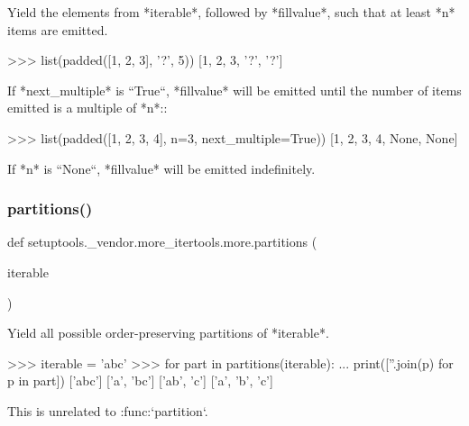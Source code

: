 \begin{DoxyVerb}Yield the elements from *iterable*, followed by *fillvalue*, such that
at least *n* items are emitted.

    >>> list(padded([1, 2, 3], '?', 5))
    [1, 2, 3, '?', '?']

If *next_multiple* is ``True``, *fillvalue* will be emitted until the
number of items emitted is a multiple of *n*::

    >>> list(padded([1, 2, 3, 4], n=3, next_multiple=True))
    [1, 2, 3, 4, None, None]

If *n* is ``None``, *fillvalue* will be emitted indefinitely.\end{DoxyVerb}
 \mbox{\label{namespacesetuptools_1_1__vendor_1_1more__itertools_1_1more_aff68c3cfb337e2d85ce1f65b4a7ac344}} 
\subsubsection{\texorpdfstring{partitions()}{partitions()}}
{\footnotesize\ttfamily def setuptools.\+\_\+vendor.\+more\+\_\+itertools.\+more.\+partitions (\begin{DoxyParamCaption}\item[{}]{iterable }\end{DoxyParamCaption})}

\begin{DoxyVerb}Yield all possible order-preserving partitions of *iterable*.

>>> iterable = 'abc'
>>> for part in partitions(iterable):
...     print([''.join(p) for p in part])
['abc']
['a', 'bc']
['ab', 'c']
['a', 'b', 'c']

This is unrelated to :func:`partition`.\end{DoxyVerb}
 \mbox{\label{namespacesetuptools_1_1__vendor_1_1more__itertools_1_1more_ad851a337658e88d4c7aa6b2bd1378a87}} 
